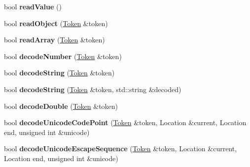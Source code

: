 \begin{DoxyCompactItemize}
\item 
\hypertarget{class_json_1_1_reader_a47e56844b803d41ec993a83fadf4495c}{bool {\bfseries read\-Value} ()}\label{class_json_1_1_reader_a47e56844b803d41ec993a83fadf4495c}

\item 
\hypertarget{class_json_1_1_reader_a0068eb3d8e86e91f0e4806f60da66b9c}{bool {\bfseries read\-Object} (\hyperlink{class_json_1_1_reader_1_1_token}{Token} \&token)}\label{class_json_1_1_reader_a0068eb3d8e86e91f0e4806f60da66b9c}

\item 
\hypertarget{class_json_1_1_reader_afd9a30c0af205c9f327613f486fae6b8}{bool {\bfseries read\-Array} (\hyperlink{class_json_1_1_reader_1_1_token}{Token} \&token)}\label{class_json_1_1_reader_afd9a30c0af205c9f327613f486fae6b8}

\item 
\hypertarget{class_json_1_1_reader_a442d1f23edf0f4350f5eeab3ee3f7d46}{bool {\bfseries decode\-Number} (\hyperlink{class_json_1_1_reader_1_1_token}{Token} \&token)}\label{class_json_1_1_reader_a442d1f23edf0f4350f5eeab3ee3f7d46}

\item 
\hypertarget{class_json_1_1_reader_aaf736937912f5c9b8d221e57f209e3e0}{bool {\bfseries decode\-String} (\hyperlink{class_json_1_1_reader_1_1_token}{Token} \&token)}\label{class_json_1_1_reader_aaf736937912f5c9b8d221e57f209e3e0}

\item 
\hypertarget{class_json_1_1_reader_a801253570f16e91519652078fb12b8e6}{bool {\bfseries decode\-String} (\hyperlink{class_json_1_1_reader_1_1_token}{Token} \&token, std\-::string \&decoded)}\label{class_json_1_1_reader_a801253570f16e91519652078fb12b8e6}

\item 
\hypertarget{class_json_1_1_reader_a2420bbb7fd6d5d3e7e2fea894dd8f70f}{bool {\bfseries decode\-Double} (\hyperlink{class_json_1_1_reader_1_1_token}{Token} \&token)}\label{class_json_1_1_reader_a2420bbb7fd6d5d3e7e2fea894dd8f70f}

\item 
\hypertarget{class_json_1_1_reader_a8fe24db3e9953aef3d637a56447e795c}{bool {\bfseries decode\-Unicode\-Code\-Point} (\hyperlink{class_json_1_1_reader_1_1_token}{Token} \&token, Location \&current, Location end, unsigned int \&unicode)}\label{class_json_1_1_reader_a8fe24db3e9953aef3d637a56447e795c}

\item 
\hypertarget{class_json_1_1_reader_a469cb6f55971d7c41fca2752a3aa5bf7}{bool {\bfseries decode\-Unicode\-Escape\-Sequence} (\hyperlink{class_json_1_1_reader_1_1_token}{Token} \&token, Location \&current, Location end, unsigned int \&unicode)}\label{class_json_1_1_reader_a469cb6f55971d7c41fca2752a3aa5bf7}


\end{DoxyCompactItemize}
